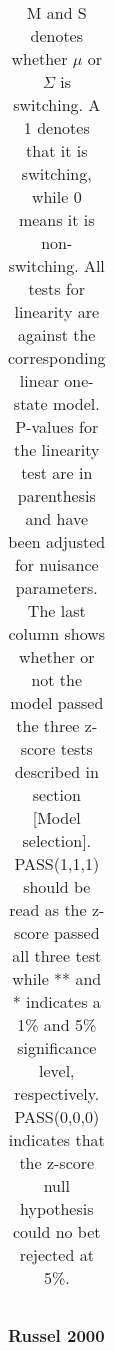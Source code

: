 \documentclass[11pt,a4paper,oneside]{article}
\begin{document}
\begin{table}[h!]
\begin{tabular}{lrrrrrrrr}
\bottomrule
\end{tabular}
\caption*{M and S denotes whether $\mu$ or $\Sigma$ is switching. A 1 denotes that it is switching, while 0 means it is non-switching. All tests for linearity are against the corresponding linear one-state model. P-values for the linearity test are in parenthesis and have been adjusted for nuisance parameters. The last column shows whether or not the model passed the three z-score tests described in section [Model selection]. PASS(1,1,1) should be read as the z-score passed all three test while ** and * indicates a 1\% and 5\% significance level, respectively. PASS(0,0,0) indicates that the z-score null hypothesis could no bet rejected at 5\%.}
\vspace{-20mm}
\end{table}

\newpage
{}
\recalctypearea





\subsubsection*{Russel 2000}


\newpage
{}
\recalctypearea
\end{document}
